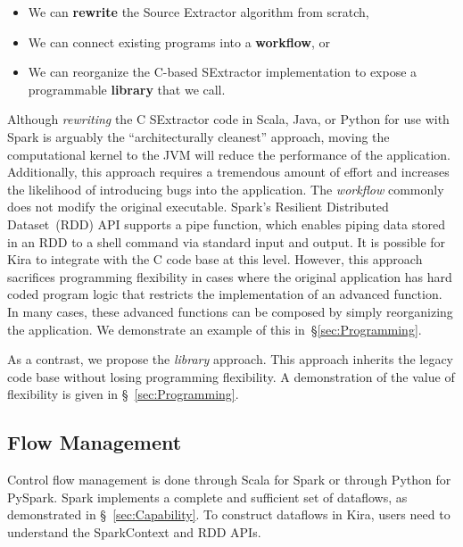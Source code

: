 \documentclass[10pt, conference, compsocconf]{IEEEtran}
\begin{document}
\begin{itemize}
\item We can \textbf{rewrite} the Source Extractor algorithm from scratch,
\item We can connect existing programs into a \textbf{workflow}, or
\item We can reorganize the C-based SExtractor implementation to expose a programmable
\textbf{library} that we call.
\end{itemize}

Although \emph{rewriting} the C SExtractor code in Scala, Java, or Python for use with Spark is arguably
the ``architecturally cleanest'' approach, moving the computational kernel to the JVM will
reduce the performance of the application. Additionally, this approach requires a tremendous
amount of effort and increases the likelihood of introducing bugs into the application. 
The \emph{workflow} commonly does not modify the original executable. Spark's
Resilient Distributed Dataset~(RDD) API supports a pipe function, which enables piping data
stored in an RDD to a shell command via standard input and output. It is possible for Kira to
integrate with the C code base at this level. However, this approach sacrifices programming
flexibility in cases where the original application has hard coded program logic that restricts
the implementation of an advanced function. In many cases, these advanced functions can be composed
by simply reorganizing the application. We demonstrate an example of this in~\S\ref{sec:Programming}.

As a contrast, we propose the \emph{library} approach. This approach inherits the legacy code
base without losing programming flexibility. A demonstration of the value of flexibility is
given in \S~\ref{sec:Programming}. 

\subsection{Flow Management}

Control flow management is done through Scala for Spark or through Python for PySpark.
Spark implements a complete and sufficient set of dataflows, as demonstrated in
\S~\ref{sec:Capability}. To construct dataflows in Kira, users need to understand
the SparkContext and RDD APIs.
\end{document}
